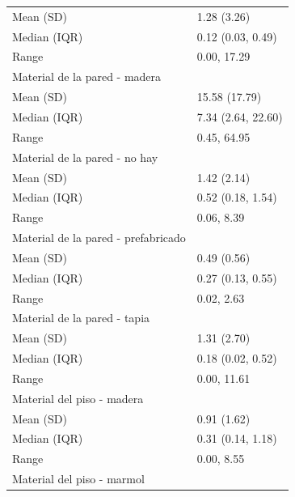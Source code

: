 \begin{table}
\begin{tabular}{ll}
\hspace{1em}Mean (SD) & 1.28 (3.26)\\
\hspace{1em}Median (IQR) & 0.12 (0.03, 0.49)\\
\hspace{1em}Range & 0.00, 17.29\\
Material de la pared - madera & \\
\addlinespace
\hspace{1em}Mean (SD) & 15.58 (17.79)\\
\hspace{1em}Median (IQR) & 7.34 (2.64, 22.60)\\
\hspace{1em}Range & 0.45, 64.95\\
Material de la pared - no hay & \\
\hspace{1em}Mean (SD) & 1.42 (2.14)\\
\addlinespace
\hspace{1em}Median (IQR) & 0.52 (0.18, 1.54)\\
\hspace{1em}Range & 0.06, 8.39\\
Material de la pared - prefabricado & \\
\hspace{1em}Mean (SD) & 0.49 (0.56)\\
\hspace{1em}Median (IQR) & 0.27 (0.13, 0.55)\\
\addlinespace
\hspace{1em}Range & 0.02, 2.63\\
Material de la pared - tapia & \\
\hspace{1em}Mean (SD) & 1.31 (2.70)\\
\hspace{1em}Median (IQR) & 0.18 (0.02, 0.52)\\
\hspace{1em}Range & 0.00, 11.61\\
\addlinespace
Material del piso - madera & \\
\hspace{1em}Mean (SD) & 0.91 (1.62)\\
\hspace{1em}Median (IQR) & 0.31 (0.14, 1.18)\\
\hspace{1em}Range & 0.00, 8.55\\
Material del piso - marmol & \\

\end{tabular}
\end{table}
